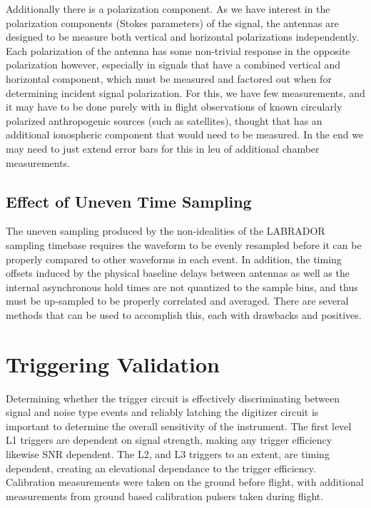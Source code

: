 		Additionally there is a polarization component.  As we have interest in the polarization components (Stokes parameters) of the signal, the antennas are designed to be measure both vertical and horizontal polarizations independently.  Each polarization of the antenna has some non-trivial response in the opposite polarization however, especially in signals that have a combined vertical and horizontal component, which must be measured and factored out when for determining incident signal polarization.  For this, we have few measurements, and it may have to be done purely with in flight observations of known circularly polarized anthropogenic sources (such as satellites), thought that has an additional ionospheric component that would need to be measured.  In the end we may need to just extend error bars for this in leu of additional chamber measurements.
		
	\subsection{Effect of Uneven Time Sampling}
	The uneven sampling produced by the non-idealities of the LABRADOR sampling timebase requires the waveform to be evenly resampled before it can be properly compared to other waveforms in each event.  In addition, the timing offsets induced by the physical baseline delays between antennas as well as the internal asynchronous hold times are not quantized to the sample bins, and thus must be up-sampled to be properly correlated and averaged.  There are several methods that can be used to accomplish this, each with drawbacks and positives.

	

	
	
\section{Triggering Validation}
	Determining whether the trigger circuit is effectively discriminating between signal and noise type events and reliably latching the digitizer circuit is important to determine the overall sensitivity of the instrument.  The first level L1 triggers are dependent on signal strength, making any trigger efficiency likewise SNR dependent.  The L2, and L3 triggers to an extent, are timing dependent, creating an elevational dependance to the trigger efficiency.  Calibration measurements were taken on the ground before flight, with additional measurements from ground based calibration pulsers taken during flight.  

